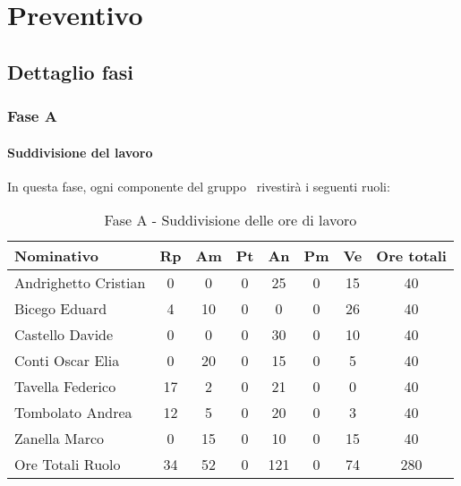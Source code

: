 \documentclass[../PianoProgetto.tex]{subfiles}
\begin{document}
	\section{Preventivo}
		\subsection{Dettaglio fasi}
			\subsubsection{Fase A}
				\paragraph{Suddivisione del lavoro}
					In questa fase, ogni componente del gruppo \leaf\ rivestirà i seguenti ruoli:
	
					\begin{table}[h]
		\centering
	
		\begin{tabular}{l * {7}{c}}
			\toprule
			Nominativo & Rp & Am & Pt & An & Pm & Ve & Ore totali \\
			\midrule
			Andrighetto Cristian & 0 & 0 &	0 &	25 & 0 & 15 & 40 \\
			\midrule
			Bicego Eduard & 4 & 10 & 0 & 0 & 0 & 26 & 40 \\
			\midrule
			Castello Davide &	0 &	0 &	0 &	30 & 0 &	10 & 40 \\
			\midrule
			Conti Oscar Elia & 0 & 20 &	0 &	15 & 0 & 5 & 40 \\
			\midrule
			Tavella Federico &	17 & 2 & 0 & 21 & 0 & 0 & 40 \\
			\midrule
			Tombolato Andrea & 12 & 5 &	0 &	20 & 0 & 3 & 40 \\
			\midrule
			Zanella Marco & 0 & 15 & 0 & 10 & 0 & 15 & 40 \\
			\midrule			
			Ore Totali Ruolo & 34 & 52 & 0 & 121 &	0 &	74 & 280 \\
			\bottomrule
			
		\end{tabular}
		
		\caption{Fase A - Suddivisione delle ore di lavoro}
		\label{tab:faseA_ore}
		
	\end{table}
	
\end{document}
